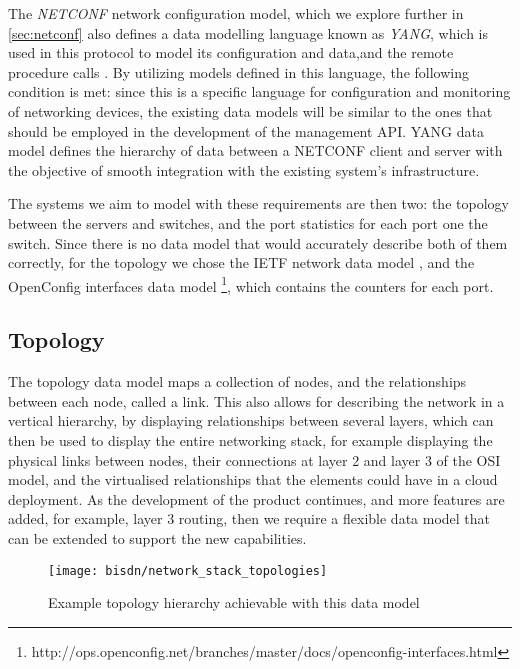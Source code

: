 \par The \textit{ NETCONF } network configuration model, which we explore further in \ref{sec:netconf} also defines a data modelling language known as \textit{YANG},
which is used in this protocol to model its configuration and data,and the remote procedure calls \cite{bjorklund_yang_2010}. By utilizing models defined in this
language, the following condition is met: since this is a specific language for configuration and monitoring of networking devices, the existing data models will be
similar to the ones that should be employed in the development of the management API. YANG data model defines the hierarchy of data between a NETCONF client and
server with the objective of smooth integration with the existing system's infrastructure. 

\par The systems we aim to model with these requirements are then two: the topology between the servers and switches, and the port statistics for each port one the
switch. Since there is no data model that would accurately describe both of them correctly, for the topology we chose the IETF network data model 
\cite{clemm_data_2017}, and the OpenConfig interfaces data model 
\footnote {http://ops.openconfig.net/branches/master/docs/openconfig-interfaces.html}, which contains the counters for each port.

\subsection {Topology}

The topology data model maps a collection of nodes, and the relationships between each node, called a link. This also allows for describing the network in a vertical
hierarchy, by displaying relationships between several layers, which can then be used to display the entire networking stack, for example displaying the physical
links between nodes, their connections at layer 2 and layer 3 of the OSI model, and the virtualised relationships that the elements could have in a cloud deployment.
As the development of the product continues, and more features are added, for example, layer 3 routing, then we require a flexible data model that can be extended to
support the new capabilities.

\begin{figure} [!htbp]
    \centering
    \texttt{[image: bisdn/network\_stack\_topologies]}
    \caption{Example topology hierarchy achievable with this data model \cite{clemm_data_2017}}
\end{figure}

